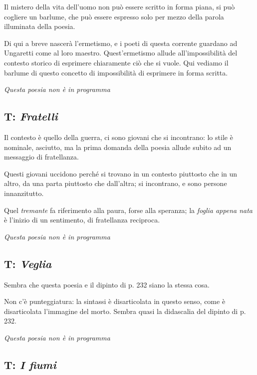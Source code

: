 Il mistero della vita dell'uomo non può essere scritto in forma piana, si può cogliere un barlume, che può essere espresso solo per mezzo della parola illuminata della poesia.

Di qui a breve nascerà l'ermetismo, e i poeti di questa corrente guardano ad Ungaretti come al loro maestro.
Quest'ermetismo allude all'impossibilità del contesto storico di esprimere chiaramente ciò che si vuole. Qui vediamo il barlume di questo concetto di impossibilità di esprimere in forma scritta.

\emph{Questa poesia non è in programma}

\subsection{T: \textit{Fratelli}}

Il contesto è quello della guerra, ci sono giovani che si incontrano: lo stile è nominale, asciutto, ma la prima domanda della poesia allude subito ad un messaggio di fratellanza.

Questi giovani uccidono perché si trovano in un contesto piuttosto che in un altro, da una parta piuttosto che dall'altra; si incontrano, e sono persone innanzitutto.

Quel \textit{tremante} fa riferimento alla paura, forse alla speranza; la \textit{foglia appena nata} è l'inizio di un sentimento, di fratellanza reciproca.

\emph{Questa poesia non è in programma}

\subsection{T: \textit{Veglia}}

Sembra che questa poesia e il dipinto di p. 232 siano la stessa cosa.

Non c'è punteggiatura: la sintassi è disarticolata in questo senso, come è disarticolata l'immagine del morto. Sembra quasi la didascalia del dipinto di p. 232.

\emph{Questa poesia non è in programma}

\subsection{T: \textit{I fiumi}}

